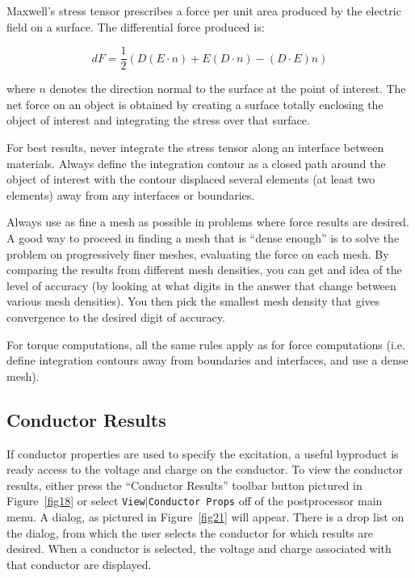 \documentclass[12pt]{report}
\begin{document}
Maxwell's stress tensor prescribes a force per unit area produced by the
electric field on a surface. The differential force produced is:

\begin{equation}
\label{eq8}
dF = \frac{1}{2}\left( {D\left( {E \cdot n} \right) + E\left( {D \cdot n}
\right) - \left( {D \cdot E} \right)n} \right)
\end{equation}

\noindent
where $n$ denotes the direction normal to the surface at the point of interest.
The net force on an object is obtained by creating a surface totally
enclosing the object of interest and integrating the stress over that
surface.

For best results, never integrate the stress tensor along an interface
between materials. Always define the integration contour as a closed path
around the object of interest with the contour displaced several elements
(at least two elements) away from any interfaces or boundaries.

Always use as fine a mesh as possible in problems where force results are
desired. A good way to proceed in finding a mesh that is ``dense enough'' is
to solve the problem on progressively finer meshes, evaluating the force on
each mesh. By comparing the results from different mesh densities, you can
get and idea of the level of accuracy (by looking at what digits in the
answer that change between various mesh densities). You then pick the
smallest mesh density that gives convergence to the desired digit of
accuracy.

For torque computations, all the same rules apply as for force computations
(i.e. define integration contours away from boundaries and interfaces, and
use a dense mesh).

\subsection{Conductor Results}

If conductor properties are used to specify the excitation, a
useful byproduct is ready access to the voltage and charge on the
conductor. To view the conductor results, either press the ``Conductor Results''
toolbar button pictured in Figure~\ref{fig18} or select \texttt{View$\vert
$Conductor Props} off of the postprocessor main menu. A dialog, as
pictured in Figure~\ref{fig21} will appear. There is a drop list on the
dialog, from which the user selects the conductor for which results
are desired. When a conductor is selected, the voltage and charge
associated with that conductor are displayed.
\end{document}
